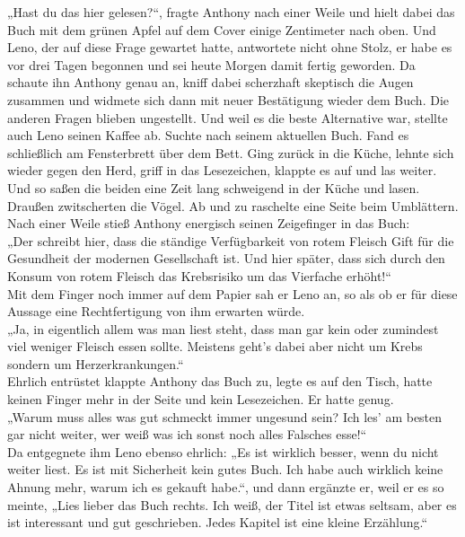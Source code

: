 \documentclass[ngerman,smalldemyvopaper,11pt,oneside,onecolumn,openright,extrafontsizes]{memoir}
\begin{document}
„Hast du das hier gelesen?“, fragte Anthony nach einer Weile und hielt dabei das Buch mit dem grünen Apfel auf dem Cover einige Zentimeter nach oben. Und Leno, der auf diese Frage gewartet hatte, antwortete nicht ohne Stolz, er habe es vor drei Tagen begonnen und sei heute Morgen damit fertig geworden. Da schaute ihn Anthony genau an, kniff dabei scherzhaft skeptisch die Augen zusammen und widmete sich dann mit neuer Bestätigung wieder dem Buch. Die anderen Fragen blieben ungestellt. Und weil es die beste Alternative war, stellte auch Leno seinen Kaffee ab. Suchte nach seinem aktuellen Buch. Fand es schließlich am Fensterbrett über dem Bett. Ging zurück in die Küche, lehnte sich wieder gegen den Herd, griff in das Lesezeichen, klappte es auf und las weiter. Und so saßen die beiden eine Zeit lang schweigend in der Küche und lasen. Draußen zwitscherten die Vögel. Ab und zu raschelte eine Seite beim Umblättern. Nach einer Weile stieß Anthony energisch seinen Zeigefinger in das Buch:
\vspace{0.5em} \\
„Der schreibt hier, dass die ständige Verfügbarkeit von rotem Fleisch Gift für die Gesundheit der modernen Gesellschaft ist. Und hier später, dass sich durch den Konsum von rotem Fleisch das Krebsrisiko um das Vierfache erhöht!“
\vspace{0.5em} \\
Mit dem Finger noch immer auf dem Papier sah er Leno an, so als ob er für diese Aussage eine Rechtfertigung von ihm erwarten würde.
\vspace{0.5em} \\
„Ja, in eigentlich allem was man liest steht, dass man gar kein oder zumindest viel weniger Fleisch essen sollte. Meistens geht's dabei aber nicht um Krebs sondern um Herzerkrankungen.“
\vspace{0.5em} \\
Ehrlich entrüstet klappte Anthony das Buch zu, legte es auf den Tisch, hatte keinen Finger mehr in der Seite und kein Lesezeichen. Er hatte genug.
\vspace{0.5em} \\
„Warum muss alles was gut schmeckt immer ungesund sein? Ich les' am besten gar nicht weiter, wer weiß was ich sonst noch alles Falsches esse!“
\vspace{0.5em} \\
Da entgegnete ihm Leno ebenso ehrlich: „Es ist wirklich besser, wenn du nicht weiter liest. Es ist mit Sicherheit kein gutes Buch. Ich habe auch wirklich keine Ahnung mehr, warum ich es gekauft habe.“, und dann ergänzte er, weil er es so meinte, „Lies lieber das Buch rechts. Ich weiß, der Titel ist etwas seltsam, aber es ist interessant und gut geschrieben. Jedes Kapitel ist eine kleine Erzählung.“
\end{document}
